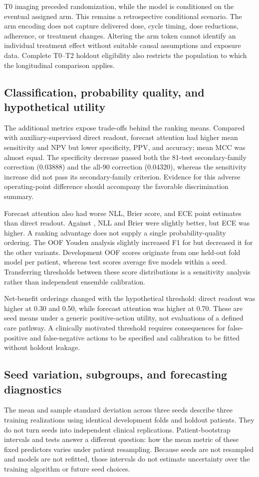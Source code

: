 T0 imaging preceded randomization, while the model is conditioned on the eventual assigned arm. This remains a retrospective conditional scenario. The arm encoding does not capture delivered dose, cycle timing, dose reductions, adherence, or treatment changes. Altering the arm token cannot identify an individual treatment effect without suitable causal assumptions and exposure data. Complete T0--T2 holdout eligibility also restricts the population to which the longitudinal comparison applies.

\subsection{Classification, probability quality, and hypothetical utility}
The additional metrics expose trade-offs behind the ranking means. Compared with auxiliary-supervised direct readout, forecast attention had higher mean sensitivity and NPV but lower specificity, PPV, and accuracy; mean MCC was almost equal. The specificity decrease passed both the 81-test secondary-family correction (0.03888) and the all-90 correction (0.04320), whereas the sensitivity increase did not pass its secondary-family criterion. Evidence for this adverse operating-point difference should accompany the favorable discrimination summary.

Forecast attention also had worse NLL, Brier score, and ECE point estimates than direct readout. Against \nojepa{}, NLL and Brier were slightly better, but ECE was higher. A ranking advantage does not supply a single probability-quality ordering. The OOF Youden analysis slightly increased F1 for \nojepa{} but decreased it for the other variants. Development OOF scores originate from one held-out fold model per patient, whereas test scores average five models within a seed. Transferring thresholds between these score distributions is a sensitivity analysis rather than independent ensemble calibration.

Net-benefit orderings changed with the hypothetical threshold: direct readout was higher at 0.30 and 0.50, while forecast attention was higher at 0.70. These are seed means under a generic positive-action utility, not evaluations of a defined care pathway. A clinically motivated threshold requires consequences for false-positive and false-negative actions to be specified and calibration to be fitted without holdout leakage.

\subsection{Seed variation, subgroups, and forecasting diagnostics}
The mean and sample standard deviation across three seeds describe three training realizations using identical development folds and holdout patients. They do not turn seeds into independent clinical replications. Patient-bootstrap intervals and tests answer a different question: how the mean metric of these fixed predictors varies under patient resampling. Because seeds are not resampled and models are not refitted, those intervals do not estimate uncertainty over the training algorithm or future seed choices.

